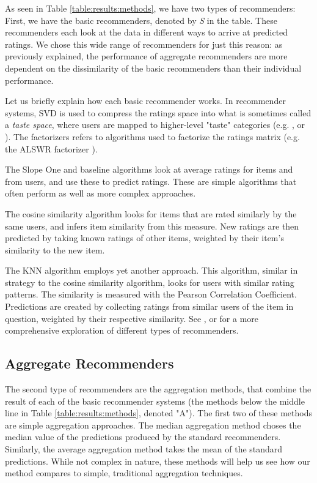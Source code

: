 As seen in Table \ref{table:results:methods}, we have two types of recommenders:
First, we have the basic recommenders, denoted by \emph{S} in the table.
These recommenders each look at the data in different ways to arrive at predicted ratings.
We chose this wide range of recommenders for just this reason:
as previously explained, the performance of aggregate recommenders
are more dependent on the dissimilarity of the basic recommenders
than their individual performance.

Let us briefly explain how each basic recommender works.
In recommender systems, SVD is used to compress the ratings space into what is sometimes called a \emph{taste space},
where users are mapped to higher-level "taste" categories
(e.g. \cite[p5]{Ahn2004}, \cite[p4]{Brand2003} or \cite[p2]{Liu2006}).
The factorizers refers to algorithms used to factorize the ratings matrix
(e.g. the ALSWR factorizer \cite{Zhou2008}).

The Slope One and baseline algorithms look at average
ratings for items and from users, and use these to predict ratings.
These are simple algorithms that often perform as well
as more complex approaches.

The cosine similarity algorithm looks for items that are rated
similarly by the same users, and infers item similarity from this measure.
New ratings are then predicted by taking known ratings of other items,
weighted by their item's similarity to the new item.

The KNN algorithm employs yet another approach. This algorithm,
similar in strategy to the cosine similarity algorithm,
looks for users with similar rating patterns.
The similarity is measured with the Pearson Correlation Coefficient.
Predictions are created by collecting ratings from similar users
of the item in question, weighted by their respective similarity.
See \cite{Adomavicius2005}, \cite{Pazzani2007} or \cite{Schafer2007}
for a more comprehensive exploration of different types of recommenders.


\subsection{Aggregate Recommenders}

The second type of recommenders are the aggregation methods, 
that combine the result of each of the basic recommender systems
(the methods below the middle line in Table \ref{table:results:methods},
denoted "A").
The first two of these methods are simple aggregation approaches.
The median aggregation method choses the median value of the predictions
produced by the standard recommenders.
Similarly, the average aggregation method takes the mean of the
standard predictions.
While not complex in nature, these methods
will help us see how our method compares to simple, traditional
aggregation techniques.

